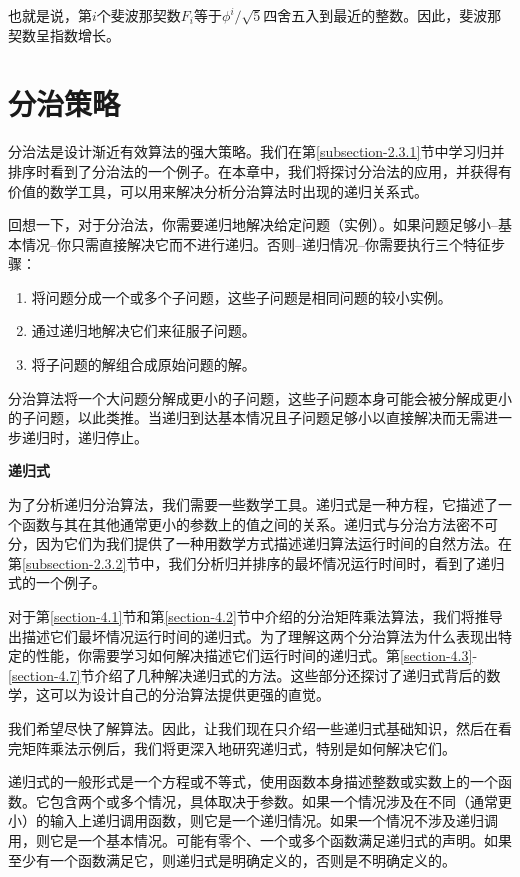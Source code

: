 \documentclass[lang=cn,newtx,10pt,scheme=chinese]{elegantbook}
\begin{document}
也就是说，第$i$个斐波那契数$F_i$等于$\phi^i / \sqrt{5}$四舍五入到最近的整数。因此，斐波那契数呈指数增长。

\chapter{分治策略}\label{chapter-04}

分治法是设计渐近有效算法的强大策略。我们在第\ref{subsection-2.3.1}节中学习归并排序时看到了分治法的一个例子。在本章中，我们将探讨分治法的应用，并获得有价值的数学工具，可以用来解决分析分治算法时出现的递归关系式。

回想一下，对于分治法，你需要递归地解决给定问题（实例）。如果问题足够小--基本情况--你只需直接解决它而不进行递归。否则--递归情况--你需要执行三个特征步骤：

\begin{enumerate}
\item 将问题分成一个或多个子问题，这些子问题是相同问题的较小实例。
\item 通过递归地解决它们来征服子问题。
\item 将子问题的解组合成原始问题的解。
\end{enumerate}

分治算法将一个大问题分解成更小的子问题，这些子问题本身可能会被分解成更小的子问题，以此类推。当递归到达基本情况且子问题足够小以直接解决而无需进一步递归时，递归停止。

\textbf{递归式}

为了分析递归分治算法，我们需要一些数学工具。递归式是一种方程，它描述了一个函数与其在其他通常更小的参数上的值之间的关系。递归式与分治方法密不可分，因为它们为我们提供了一种用数学方式描述递归算法运行时间的自然方法。在第\ref{subsection-2.3.2}节中，我们分析归并排序的最坏情况运行时间时，看到了递归式的一个例子。

对于第\ref{section-4.1}节和第\ref{section-4.2}节中介绍的分治矩阵乘法算法，我们将推导出描述它们最坏情况运行时间的递归式。为了理解这两个分治算法为什么表现出特定的性能，你需要学习如何解决描述它们运行时间的递归式。第\ref{section-4.3}-\ref{section-4.7}节介绍了几种解决递归式的方法。这些部分还探讨了递归式背后的数学，这可以为设计自己的分治算法提供更强的直觉。

我们希望尽快了解算法。因此，让我们现在只介绍一些递归式基础知识，然后在看完矩阵乘法示例后，我们将更深入地研究递归式，特别是如何解决它们。

递归式的一般形式是一个方程或不等式，使用函数本身描述整数或实数上的一个函数。它包含两个或多个情况，具体取决于参数。如果一个情况涉及在不同（通常更小）的输入上递归调用函数，则它是一个递归情况。如果一个情况不涉及递归调用，则它是一个基本情况。可能有零个、一个或多个函数满足递归式的声明。如果至少有一个函数满足它，则递归式是明确定义的，否则是不明确定义的。
\end{document}
